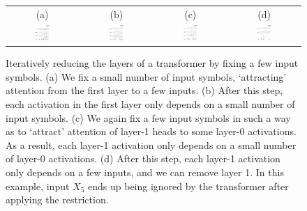 \documentclass[11pt,a4paper]{article}
\begin{document}
\begin{figure}[ht]
    \centering
    \begin{tabular}{cccc}
    (a) & (b) & (c) & (d) \\
    \includegraphics[width=0.23\textwidth]{figures/sa1.png} &
        \includegraphics[width=0.23\textwidth]{figures/sa2.png}&
    \includegraphics[width=0.22\textwidth]{figures/sa3.png} &
        \includegraphics[width=0.23\textwidth]{figures/sa4.png}
        \end{tabular}
	\caption{Iteratively reducing the layers of a transformer by fixing a few input symbols. (a) We fix a small number of input symbols, `attracting' attention from the first layer to a few inputs. (b) After this step, each activation in the first layer only depends on a small number of input symbols. (c) We again fix a few input symbols in such a way as to `attract' attention of layer-1 heads to some layer-0 activations. As a result, each layer-1 activation only depends on a small number of layer-0 activations. (d) After this step, each layer-1 activation only depends on a few inputs, and we can remove layer 1. In this example, input $X_5$ ends up being ignored by the transformer after applying the restriction.}
	\label{fig:depth-reduction}
\end{figure}
\end{document}

